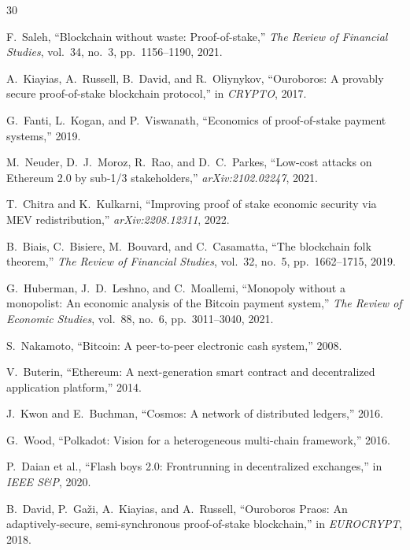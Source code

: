 
\begin{thebibliography}{30}

F.~Saleh, ``Blockchain without waste: Proof-of-stake,'' \emph{The Review of Financial Studies}, vol.~34, no.~3, pp.~1156--1190, 2021.

A.~Kiayias, A.~Russell, B.~David, and R.~Oliynykov, ``Ouroboros: A provably secure proof-of-stake blockchain protocol,'' in \emph{CRYPTO}, 2017.

G.~Fanti, L.~Kogan, and P.~Viswanath, ``Economics of proof-of-stake payment systems,'' 2019.

M.~Neuder, D.~J.~Moroz, R.~Rao, and D.~C.~Parkes, ``Low-cost attacks on Ethereum 2.0 by sub-1/3 stakeholders,'' \emph{arXiv:2102.02247}, 2021.

T.~Chitra and K.~Kulkarni, ``Improving proof of stake economic security via MEV redistribution,'' \emph{arXiv:2208.12311}, 2022.

B.~Biais, C.~Bisiere, M.~Bouvard, and C.~Casamatta, ``The blockchain folk theorem,'' \emph{The Review of Financial Studies}, vol.~32, no.~5, pp.~1662--1715, 2019.

G.~Huberman, J.~D.~Leshno, and C.~Moallemi, ``Monopoly without a monopolist: An economic analysis of the Bitcoin payment system,'' \emph{The Review of Economic Studies}, vol.~88, no.~6, pp.~3011--3040, 2021.

S.~Nakamoto, ``Bitcoin: A peer-to-peer electronic cash system,'' 2008.

V.~Buterin, ``Ethereum: A next-generation smart contract and decentralized application platform,'' 2014.

J.~Kwon and E.~Buchman, ``Cosmos: A network of distributed ledgers,'' 2016.

G.~Wood, ``Polkadot: Vision for a heterogeneous multi-chain framework,'' 2016.

P.~Daian et al., ``Flash boys 2.0: Frontrunning in decentralized exchanges,'' in \emph{IEEE S\&P}, 2020.

B.~David, P.~Ga\v{z}i, A.~Kiayias, and A.~Russell, ``Ouroboros Praos: An adaptively-secure, semi-synchronous proof-of-stake blockchain,'' in \emph{EUROCRYPT}, 2018.


\end{thebibliography}
